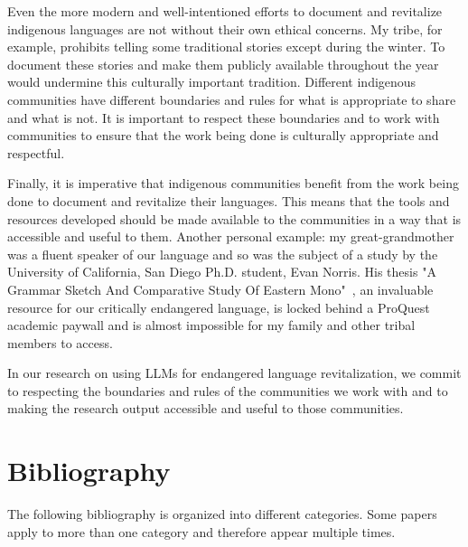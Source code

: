 \documentclass{article}
\begin{document}
Even the more modern and well-intentioned efforts to document and revitalize indigenous languages are not without their own ethical concerns.
My tribe, for example, prohibits telling some traditional stories except during the winter.
To document these stories and make them publicly available throughout the year would undermine this culturally important tradition.
Different indigenous communities have different boundaries and rules for what is appropriate to share and what is not.
It is important to respect these boundaries and to work with communities to ensure that the work being done is culturally appropriate and respectful.

Finally, it is imperative that indigenous communities benefit from the work being done to document and revitalize their languages.
This means that the tools and resources developed should be made available to the communities in a way that is accessible and useful to them.
Another personal example: my great-grandmother was a fluent speaker of our language and so was the subject of a study by the University of California, San Diego Ph.D. student, Evan Norris.
His thesis "A Grammar Sketch And Comparative Study Of Eastern Mono"~\cite{mnr_grammar}, an invaluable resource for our critically endangered language, is locked behind a ProQuest academic paywall and is almost impossible for my family and other tribal members to access.

In our research on using LLMs for endangered language revitalization, we commit to respecting the boundaries and rules of the communities we work with and to making the research output accessible and useful to those communities.

\newpage
\section*{Bibliography}
The following bibliography is organized into different categories.
Some papers apply to more than one category and therefore appear multiple times.

\nocite{*}
\printbibliography[
    heading=bibsection,
    keyword={our-work},
    title={Our Work}
]
\printbibliography[
    heading=bibsection,
    keyword={llm},
    title={Work on LLMs (Large Language Models)}
]
\printbibliography[
    heading=bibsection,
    keyword={low-resource},
    title={Work on Low-Resource Languages}
]
\printbibliography[
    heading=bibsection,
    keyword={rbmt},
    title={Work on RBMT (Rule-Based Machine Translation)}
]
\printbibliography[
    heading=bibsection,
    keyword={rag},
    title={Work on RAG (Retrieval Augmented Generation)}
]
\printbibliography[
    heading=bibsection,
    keyword={embeddings},
    title={Work on Embeddings \& Semantic Similarity}
]
\printbibliography[
    heading=bibsection,
    keyword={linguistic-probing},
    title={Work on Linguistic Probing}
]

\printbibliography[
    heading=bibsection,
    keyword={embeddings-models},
    title={Embeddings Models}
]
\printbibliography[
    heading=bibsection,
    keyword={other},
    title={Other References}
]
\end{document}
